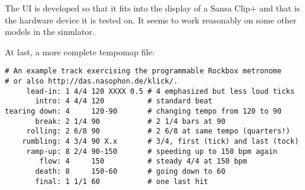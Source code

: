 The UI is developed so that it fits into the display of a Sansa Clip+ and
that is the hardware device it is tested on. It seems to work reasonably
on some other models in the simulator.

At last, a more complete tempomap file:
\begin{verbatim}
# An example track exercising the programmable Rockbox metronome
# or also http://das.nasophon.de/klick/.
     lead-in: 1 4/4 120 XXXX 0.5 # 4 emphasized but less loud ticks
       intro: 4 4/4 120          # standard beat
tearing down: 4     120-90       # changing tempo from 120 to 90
       break: 2 1/4 90           # 2 1/4 bars at 90
     rolling: 2 6/8 90           # 2 6/8 at same tempo (quarters!)
    rumbling: 4 3/4 90 X.x       # 3/4, first (tick) and last (tock)
     ramp-up: 8 2/4 90-150       # speeding up to 150 bpm again
        flow: 4     150          # steady 4/4 at 150 bpm
       death: 8     150-60       # going down to 60
       final: 1 1/1 60           # one last hit
\end{verbatim}
